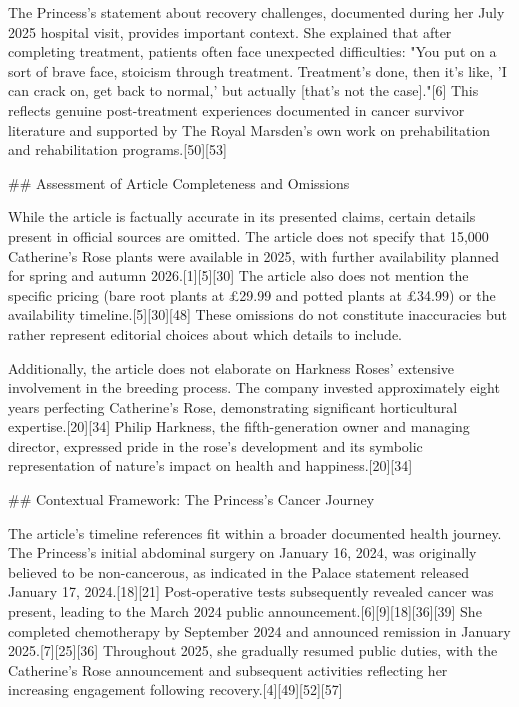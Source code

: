 \documentclass[10pt,a4paper]{article}
\begin{document}
\par\medskip
The Princess's statement about recovery challenges, documented during her July 2025 hospital visit, provides important context. She explained that after completing treatment, patients often face unexpected difficulties: "You put on a sort of brave face, stoicism through treatment. Treatment's done, then it's like, 'I can crack on, get back to normal,' but actually [that's not the case]."[6] This reflects genuine post-treatment experiences documented in cancer survivor literature and supported by The Royal Marsden's own work on prehabilitation and rehabilitation programs.[50][53]
\par\medskip
\#\# Assessment of Article Completeness and Omissions
\par\medskip
While the article is factually accurate in its presented claims, certain details present in official sources are omitted. The article does not specify that 15,000 Catherine's Rose plants were available in 2025, with further availability planned for spring and autumn 2026.[1][5][30] The article also does not mention the specific pricing (bare root plants at £29.99 and potted plants at £34.99) or the availability timeline.[5][30][48] These omissions do not constitute inaccuracies but rather represent editorial choices about which details to include.
\par\medskip
Additionally, the article does not elaborate on Harkness Roses' extensive involvement in the breeding process. The company invested approximately eight years perfecting Catherine's Rose, demonstrating significant horticultural expertise.[20][34] Philip Harkness, the fifth-generation owner and managing director, expressed pride in the rose's development and its symbolic representation of nature's impact on health and happiness.[20][34]
\par\medskip
\#\# Contextual Framework: The Princess's Cancer Journey
\par\medskip
The article's timeline references fit within a broader documented health journey. The Princess's initial abdominal surgery on January 16, 2024, was originally believed to be non-cancerous, as indicated in the Palace statement released January 17, 2024.[18][21] Post-operative tests subsequently revealed cancer was present, leading to the March 2024 public announcement.[6][9][18][36][39] She completed chemotherapy by September 2024 and announced remission in January 2025.[7][25][36] Throughout 2025, she gradually resumed public duties, with the Catherine's Rose announcement and subsequent activities reflecting her increasing engagement following recovery.[4][49][52][57]
\end{document}
